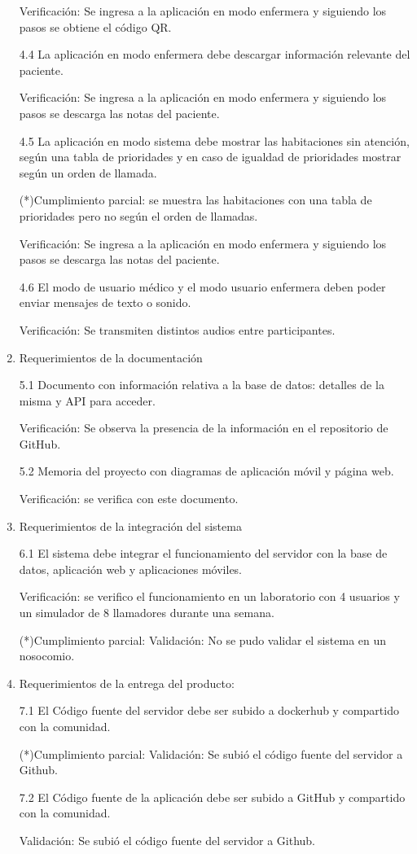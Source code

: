 \begin{enumerate}
Verificación: Se ingresa a la aplicación en modo enfermera y siguiendo los pasos se obtiene el código QR.

4.4 La aplicación en modo enfermera debe descargar información relevante del paciente.

Verificación: Se ingresa a la aplicación en modo enfermera y siguiendo los pasos se descarga las notas del paciente.

4.5 La aplicación en modo sistema debe mostrar las habitaciones sin atención, según una tabla de prioridades y en caso de igualdad de prioridades mostrar según un orden de llamada.

(*)Cumplimiento parcial: se muestra las habitaciones con una tabla de prioridades pero no según el orden de llamadas.

Verificación: Se ingresa a la aplicación en modo enfermera y siguiendo los pasos se descarga las notas del paciente.


4.6 El modo de usuario médico y el modo usuario enfermera deben poder enviar mensajes de texto o sonido.

Verificación: Se transmiten distintos audios entre participantes.

\item Requerimientos de la documentación

5.1 Documento con información relativa a la base de datos: detalles de la misma y API para acceder.

Verificación: Se observa la presencia de la información en el repositorio de GitHub.

5.2 Memoria del proyecto con diagramas de aplicación móvil y página web.

Verificación: se verifica con este documento.

\item Requerimientos de la integración del sistema

6.1 El sistema debe integrar el funcionamiento del servidor con la base de datos, aplicación web y aplicaciones móviles.

Verificación: se verifico el funcionamiento en un laboratorio con 4 usuarios y un simulador de 8 llamadores durante una semana.

(*)Cumplimiento parcial:
Validación: No se pudo validar el sistema en un nosocomio.

\item Requerimientos de la entrega del producto:

7.1 El Código fuente del servidor debe ser subido a dockerhub y compartido con la comunidad.

(*)Cumplimiento parcial:
Validación: Se subió el código fuente del servidor a Github.

7.2 El Código fuente de la aplicación debe ser subido a GitHub y compartido con la comunidad.

Validación: Se subió el código fuente del servidor a Github.

\end{enumerate}

